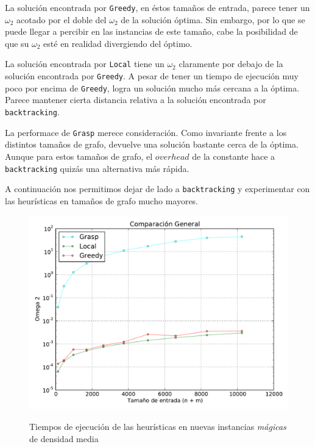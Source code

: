 La solución encontrada por \texttt{Greedy}, en éstos tamaños de entrada, parece tener un $\omega_2$ acotado por el doble del $\omega_2$ de la solución óptima. Sin embargo, por lo que se puede llegar a percibir en las instancias de este tamaño, cabe la posibilidad de que su $\omega_2$ esté en realidad divergiendo del óptimo.

La solución encontrada por \texttt{Local} tiene un $\omega_2$ claramente por debajo de la solución encontrada por \texttt{Greedy}. A pesar de tener un tiempo de ejecución muy poco por encima de \texttt{Greedy}, logra un solución mucho más cercana a la óptima. Parece mantener cierta distancia relativa a la solución encontrada por \texttt{backtracking}.

La performace de \texttt{Grasp} merece consideración. Como invariante frente a los distintos tamaños de grafo, devuelve una solución bastante cerca de la óptima. Aunque para estos tamaños de grafo, el $overhead$ de la constante hace a \texttt{backtracking} quizás una alternativa más rápida.

A continuación nos permitimos dejar de lado a \texttt{backtracking} y experimentar con las heurísticas en tamaños de grafo mucho mayores.

\begin{figure}[H]
\begin{center}
\includegraphics[angle=0, scale=.75]{imagenes/todas_tiempo_2014-07-25_16-24-45.pdf}
\label{grafico local calidad}
\caption{Tiempos de ejecución de las heurísticas en nuevas instancias \textit{mágicas} de densidad media}
\end{center}
\end{figure}


